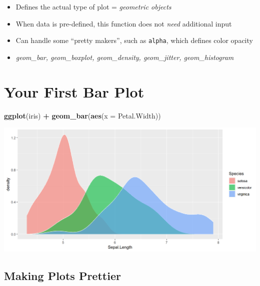 \documentclass[
]{book}
\newenvironment{Shaded}{\begin{snugshade}}{\end{snugshade}}
\newcommand{\AttributeTok}[1]{\textcolor[rgb]{0.13,0.29,0.53}{#1}}
\newcommand{\FunctionTok}[1]{\textcolor[rgb]{0.13,0.29,0.53}{\textbf{#1}}}
\newcommand{\NormalTok}[1]{#1}
\newcommand{\SpecialCharTok}[1]{\textcolor[rgb]{0.81,0.36,0.00}{\textbf{#1}}}
\providecommand{\tightlist}{%
  \setlength{\itemsep}{0pt}\setlength{\parskip}{0pt}}
\begin{document}
\begin{itemize}
\tightlist
\item
  Defines the actual type of plot = \emph{geometric objects}
\item
  When data is pre-defined, this function does not \emph{need} additional input
\item
  Can handle some ``pretty makers'', such as \texttt{alpha}, which defines color opacity
\item
  \emph{geom\_bar, geom\_boxplot, geom\_density, geom\_jitter, geom\_histogram}
\end{itemize}

\section{Your First Bar Plot}\label{your-first-bar-plot}

\begin{Shaded}
\begin{Highlighting}[]
\FunctionTok{ggplot}\NormalTok{(iris) }\SpecialCharTok{+} 
  \FunctionTok{geom\_bar}\NormalTok{(}\FunctionTok{aes}\NormalTok{(}\AttributeTok{x =}\NormalTok{ Petal.Width)) }
\end{Highlighting}
\end{Shaded}

\begin{flushleft}\includegraphics{_main_files/figure-html/unnamed-chunk-35-1} \end{flushleft}

\subsection{Making Plots Prettier}\label{making-plots-prettier}
\end{document}

